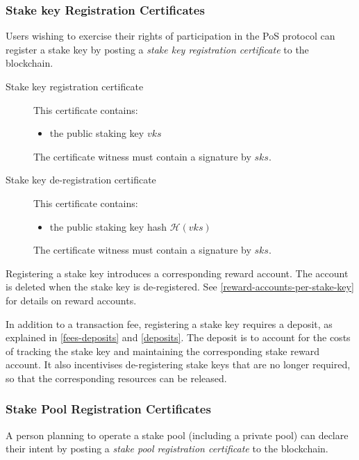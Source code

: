 \documentclass[11pt,a4paper,dvipsnames,twosided]{article}
\begin{document}
\subsubsection{Stake key Registration Certificates}
\label{stake-key-registration-certificates}

Users wishing to exercise their rights of participation in the PoS
protocol can register a stake key by posting a \emph{stake key
registration certificate} to the blockchain.

\begin{description}
\item[Stake key registration certificate]
This certificate contains:

\begin{itemize}
\item
  the public staking key \(vks\)
\end{itemize}

The certificate witness must contain a signature by \(sks\).
\item[Stake key de-registration certificate]
This certificate contains:

\begin{itemize}
\item
  the public staking key hash \(\mathcal{H}(vks)\)
\end{itemize}

The certificate witness must contain a signature by \(sks\).
\end{description}

Registering a stake key introduces a corresponding reward account.
The account is deleted when the stake key is de-registered. See
\cref{reward-accounts-per-stake-key} for details on reward accounts.

In addition to a transaction fee, registering a stake key requires a deposit, as
explained in \cref{fees-deposits} and \cref{deposits}. The deposit is to account
for the costs of tracking the stake key and maintaining the corresponding stake
reward account. It also incentivises de-registering stake keys that are no
longer required, so that the corresponding resources can be released.

\subsubsection{Stake Pool Registration Certificates}
\label{stake-pool-registration-certificates}

A person planning to operate a stake pool (including a private pool) can
declare their intent by posting a \emph{stake pool registration certificate} to
the blockchain.
\end{document}
